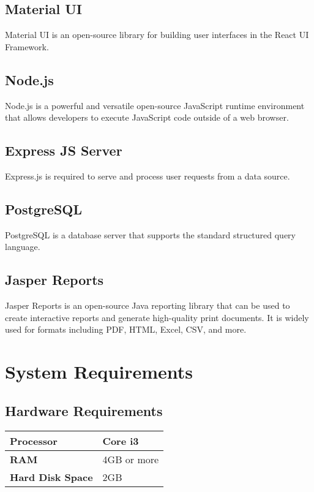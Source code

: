 \subsection{Material UI}
Material UI is an open-source library for building user interfaces in the React UI Framework.

\subsection{Node.js}
Node.js is a powerful and versatile open-source JavaScript runtime environment that allows developers to execute JavaScript code outside of a web browser.

\subsection{Express JS Server}
Express.js is required to serve and process user requests from a data source.

\subsection{PostgreSQL}
PostgreSQL is a database server that supports the standard structured query language.

\subsection{Jasper Reports}
Jasper Reports is an open-source Java reporting library that can be used to create interactive reports and generate high-quality print documents. It is widely used for formats including PDF, HTML, Excel, CSV, and more.



\section{System Requirements}

\subsection*{Hardware Requirements}
\begin{tabular}{|p{2.5cm}|p{2.5cm}|}
  \hline
  \textbf{Processor} & Core i3 \\
  \hline
  \textbf{RAM} & 4GB or more \\
  \hline
  \textbf{Hard Disk Space} & 2GB \\
  \hline
\end{tabular}


